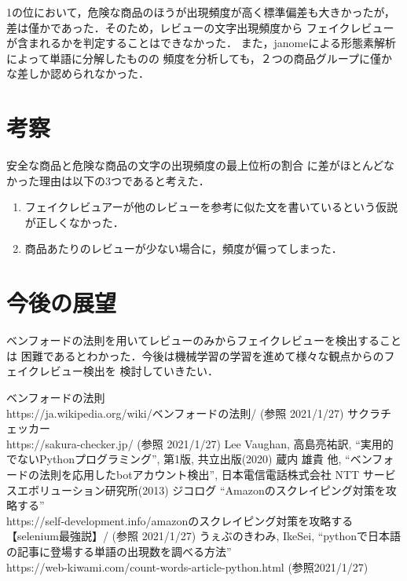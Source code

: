 \documentclass[a4paper, twocolumn]{jsarticle}
\begin{document}
1の位において，危険な商品のほうが出現頻度が高く標準偏差も大きかったが，
差は僅かであった．そのため，レビューの文字出現頻度から
フェイクレビューが含まれるかを判定することはできなかった．
また，janomeによる形態素解析によって単語に分解したものの
頻度を分析しても，２つの商品グループに僅かな差しか認められなかった．

\section{考察}
安全な商品と危険な商品の文字の出現頻度の最上位桁の割合
に差がほとんどなかった理由は以下の3つであると考えた．

\begin{enumerate}
  \item フェイクレビュアーが他のレビューを参考に似た文を書いているという仮説が正しくなかった．
  \item 商品あたりのレビューが少ない場合に，頻度が偏ってしまった．
\end{enumerate}


\section{今後の展望}
ベンフォードの法則を用いてレビューのみからフェイクレビューを検出することは
困難であるとわかった．今後は機械学習の学習を進めて様々な観点からのフェイクレビュー検出を
検討していきたい．

\begin{thebibliography}{7}
   ベンフォードの法則 \\ https://ja.wikipedia.org/wiki/ベンフォードの法則/ (参照 2021/1/27)
   サクラチェッカー \\ https://sakura-checker.jp/ (参照 2021/1/27)
   Lee Vaughan, 高島亮祐訳, ``実用的でないPythonプログラミング'', 第1版, 共立出版(2020)
   蔵内 雄貴 他, ``ベンフォードの法則を応用したbotアカウント検出'', 日本電信電話株式会社 NTT サービスエボリューション研究所(2013)
   ジコログ ``Amazonのスクレイピング対策を攻略する'' \\ https://self-development.info/amazonのスクレイピング対策を攻略する【selenium最強説】/ (参照 2021/1/27)
   うぇぶのきわみ, IkeSei, ``pythonで日本語の記事に登場する単語の出現数を調べる方法'' \\ https://web-kiwami.com/count-words-article-python.html (参照2021/1/27)
\end{thebibliography}
\end{document}
